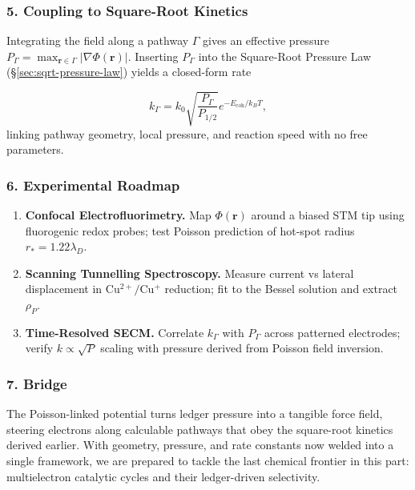 \documentclass[11pt,oneside]{book}
\begin{document}
\subsubsection*{5. Coupling to Square-Root Kinetics}

Integrating the field along a pathway \(\Gamma\) gives an effective
pressure
\(P_\Gamma = \max_{\mathbf r\in\Gamma}
   \bigl| \nabla\Phi(\mathbf r) \bigr|\).
Inserting \(P_\Gamma\) into the Square-Root Pressure Law
(\S\;\ref{sec:sqrt-pressure-law}) yields a closed-form rate

\[
   k_\Gamma
   =
   k_0
   \sqrt{ \frac{P_\Gamma}{P_{1/2}} }
   e^{-E_{\text{coh}}/k_BT},
\]
linking pathway geometry, local pressure, and reaction speed with no free
parameters.

\subsubsection*{6. Experimental Roadmap}

\begin{enumerate}[label=\textbf{\arabic*.}, leftmargin=1.2cm]
\item \textbf{Confocal Electrofluorimetry.}  
      Map \(\Phi(\mathbf r)\) around a biased STM tip using
      fluorogenic redox probes; test Poisson prediction of hot-spot
      radius \(r_\ast = 1.22\lambda_D\).
\item \textbf{Scanning Tunnelling Spectroscopy.}  
      Measure current vs lateral displacement in
      \(\mathrm{Cu^{2+}/Cu^+}\) reduction; fit to the Bessel solution and
      extract \(\rho_P\).
\item \textbf{Time-Resolved SECM.}  
      Correlate \(k_\Gamma\) with \(P_\Gamma\) across patterned
      electrodes; verify \(k\propto\sqrt{P}\) scaling with
      pressure derived from Poisson field inversion.
\end{enumerate}

\subsubsection*{7. Bridge}

The Poisson-linked potential turns ledger pressure into a tangible force
field, steering electrons along calculable pathways that obey the
square-root kinetics derived earlier.
With geometry, pressure, and rate constants now welded into a single
framework, we are prepared to tackle the last chemical frontier in this
part: multielectron catalytic cycles and their ledger-driven selectivity.
\end{document}
